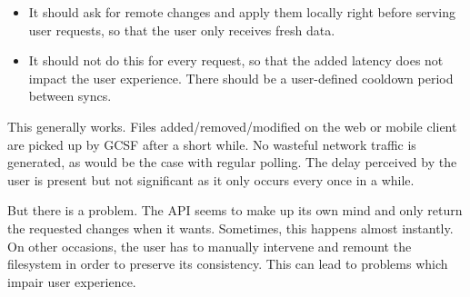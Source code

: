 \begin{itemize}
  \itemsep0em
  \item It should ask for remote changes and apply them locally right before serving user requests, so that the user only receives fresh data.
  \item It should not do this for every request, so that the added latency does not impact the user experience. There should be a user-defined cooldown period between syncs.
\end{itemize}

This generally works. Files added/removed/modified on the web or mobile client are picked up by GCSF after a short while. No wasteful network traffic is generated, as would be the case with regular polling. The delay perceived by the user is present but not significant as it only occurs every once in a while.

But there is a problem. The API seems to make up its own mind and only return the requested changes when it wants. Sometimes, this happens almost instantly. On other occasions, the user has to manually intervene and remount the filesystem in order to preserve its consistency. This can lead to problems which impair user experience.
